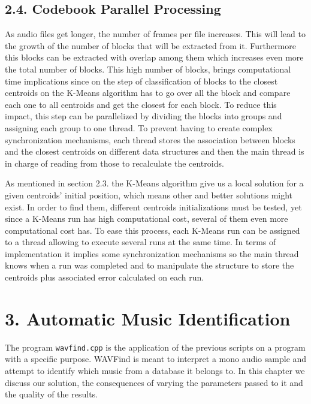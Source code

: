 \documentclass[12pt]{article}
\begin{document}
\newpage  
\subsection*{2.4. Codebook Parallel Processing}

As audio files get longer, the number of frames per file increases.
This will lead to the growth of the number of blocks that will be
extracted from it.
Furthermore this blocks can be extracted with overlap among them
which increases even more the total number of blocks.
This high number of blocks, brings computational time implications
since on the step of classification of blocks to the closest
centroids on the K-Means algorithm has to go over all the block and
compare each one to all centroids and get the closest for each block.
To reduce this impact, this step can be parallelized by dividing the
blocks into groups and assigning each group to one thread.
To prevent having to create complex synchronization mechanisms, each
thread stores the association between blocks and the closest
centroids on different data structures and then the main thread is in
charge of reading from those to recalculate the centroids.

As mentioned in section 2.3. the K-Means algorithm give us a local
solution for a given centroids' initial position, which means other
and better solutions might exist.
In order to find them, different centroids initializations must be
tested, yet since a K-Means run has high computational cost, several
of them even more computational cost has.
To ease this process, each K-Means run can be assigned to a thread
allowing to execute several runs at the same time.
In terms of implementation it implies some synchronization mechanisms
so the main thread knows when a run was completed and to manipulate
the structure to store the centroids plus associated error calculated
on each run.

\newpage
\section*{3. Automatic Music Identification}

The program \texttt{wavfind.cpp} is the application of the previous scripts on a 
program with a specific purpose.
WAVFind is meant to interpret a mono audio sample and attempt to identify which music 
from a database it belongs to.
In this chapter we discuss our solution, the consequences of varying the 
parameters passed to it and the quality of the results.
\end{document}
